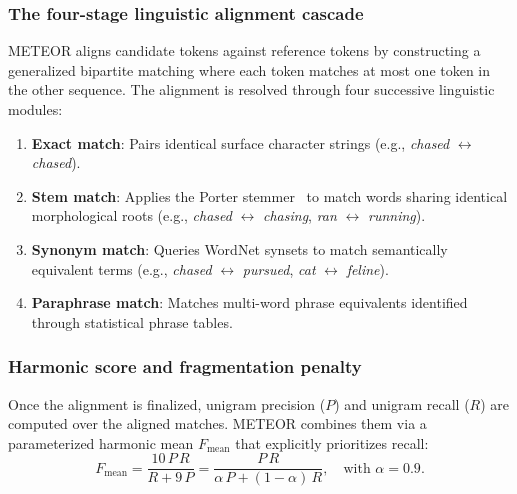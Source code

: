 \documentclass[../../../main.tex]{subfiles}
\begin{document}
\subsubsection{The four-stage linguistic alignment cascade}
METEOR aligns candidate tokens against reference tokens by constructing a generalized bipartite matching where each token matches at most one token in the other sequence. The alignment is resolved through four successive linguistic modules:
\begin{enumerate}
    \item \textbf{Exact match}: Pairs identical surface character strings (e.g., \textit{chased} $\leftrightarrow$ \textit{chased}).
    \item \textbf{Stem match}: Applies the Porter stemmer~\cite{banerjee2005meteor} to match words sharing identical morphological roots (e.g., \textit{chased} $\leftrightarrow$ \textit{chasing}, \textit{ran} $\leftrightarrow$ \textit{running}).
    \item \textbf{Synonym match}: Queries WordNet synsets to match semantically equivalent terms (e.g., \textit{chased} $\leftrightarrow$ \textit{pursued}, \textit{cat} $\leftrightarrow$ \textit{feline}).
    \item \textbf{Paraphrase match}: Matches multi-word phrase equivalents identified through statistical phrase tables.
\end{enumerate}

\subsubsection{Harmonic score and fragmentation penalty}
Once the alignment is finalized, unigram precision ($P$) and unigram recall ($R$) are computed over the aligned matches. METEOR combines them via a parameterized harmonic mean $F_{\text{mean}}$ that explicitly prioritizes recall:
\begin{equation}
\label{eq:meteor_fmean}
F_{\text{mean}} = \frac{10 \, P \, R}{R + 9 \, P} = \frac{P \, R}{\alpha \, P + (1 - \alpha) \, R}, \quad \text{with } \alpha = 0.9.
\end{equation}
\end{document}
